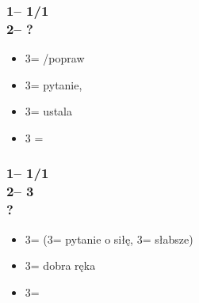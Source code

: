 \documentclass[12pt, a4paper]{report}
\begin{document}
\subsubsection*{1\major -- 1\spades/1\nt\\
                2\nt -- ?}
\begin{itemize}
    \item 3\clubs = \pass/popraw
    \item 3\diams = pytanie, \gf
    \item 3\major = ustala \major
    \item 3\twosuit{\spades}{\hearts} = \nat
\end{itemize}

\subsubsection*{1\major -- 1\spades/1\nt\\
                2\nt -- 3\diams\\
                ?}
\begin{itemize}
    \item 3\hearts = \clubs (3\spades = pytanie o siłę, 3\nt = słabsze)
    \item 3\spades = \diams dobra ręka
    \item 3\nt = \diams
\end{itemize}
\end{document}
